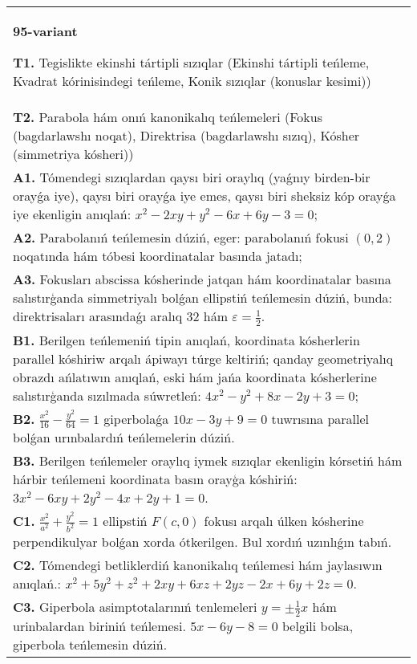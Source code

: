 \documentclass{article}
\begin{document}
\begin{tabular}{m{17cm}}
\textbf{95-variant}
\newline

\textbf{T1.} Tegislikte ekinshi tártipli sızıqlar (Ekinshi tártipli teńleme, Kvadrat kórinisindegi teńleme, Konik sızıqlar (konuslar kesimi)) \\
\textbf{T2.} Parabola hám onıń kanonikalıq teńlemeleri (Fokus (bagdarlawshı noqat), Direktrisa (bagdarlawshı sızıq), Kósher (simmetriya kósheri)) \\
\textbf{A1.} Tómendegi sızıqlardan qaysı biri oraylıq (yaǵnıy birden-bir orayǵa iye), qaysı biri orayǵa iye emes, qaysı biri sheksiz kóp orayǵa iye ekenligin anıqlań:  $x^2-2 x y+y^2-6 x+6 y-3=0$; \\
\textbf{A2.} Parabolanıń teńlemesin dúziń, eger: parabolanıń fokusi $ (0,2) $ noqatında hám tóbesi koordinatalar basında jatadı; \\
\textbf{A3.} Fokusları abscissa kósherinde jatqan hám koordinatalar basına salıstırģanda simmetriyalı bolǵan ellipstiń teńlemesin dúziń, bunda: direktrisaları arasındaǵı aralıq 32 hám $\varepsilon=\frac{1}{2}$. \\
\textbf{B1.} Berilgen teńlemeniń tipin anıqlań, koordinata kósherlerin parallel kóshiriw arqalı ápiwayı túrge keltiriń; qanday geometriyalıq obrazdı ańlatıwın anıqlań, eski hám jańa koordinata kósherlerine salıstırģanda sızılmada súwretleń: $4 x^2-y^2+8 x-2 y+3=0$; \\
\textbf{B2.} $\frac{x^2}{16}-\frac{y^2}{64}=1$ giperbolaǵa $10 x-3 y+9=0$ tuwrısına parallel bolǵan urınbalardıń teńlemelerin dúziń. \\
\textbf{B3.} Berilgen teńlemeler oraylıq iymek sızıqlar ekenligin kórsetiń hám hárbir teńlemeni koordinata basın orayģa kóshiriń: $3x^2-6xy+2y^2-4x+2y+1=0$. \\
\textbf{C1.} $\frac{x^2}{a^2}+\frac{y^2}{b^2}=1$ ellipstiń $F(c, 0)$ fokusı arqalı úlken kósherine perpendikulyar bolǵan xorda ótkerilgen. Bul xordıń uzınlıǵın tabıń. \\
\textbf{C2.} Tómendegi betliklerdiń kanonikalıq teńlemesi hám jaylasıwın anıqlań.: $x^2+5 y^2+z^2+2 x y+6 x z+2 y z-2 x+6 y+2 z=0$. \\
\textbf{C3.} Giperbola asimptotalarınıń tenlemeleri $y= \pm \frac{1}{2} x$ hám urinbalardan biriniń teńlemesi. $5 x-6 y-8=0$ belgili bolsa, giperbola teńlemesin dúziń. \\

\end{tabular}
\vspace{1cm}
\end{document}

